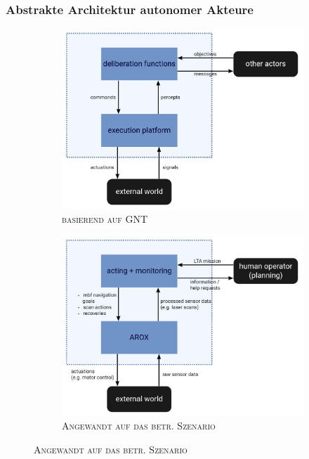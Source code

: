 \documentclass{beamer}
\begin{document}
\begin{frame}
  \frametitle{Abstrakte Architektur autonomer Akteure}
  \begin{figure}[H]
    \centering
    \begin{subfigure}[b]{0.49\textwidth}
        \centering
        \includegraphics[width=\textwidth]{img/GNT_actor_new.png}
        \caption*{\textsc{ basierend auf GNT \cite{GNT:2016}}}
    \end{subfigure}
    \hfill
    \begin{subfigure}[b]{0.49\textwidth}
        \centering
        \includegraphics[width=\textwidth]{img/MSC_actor_new.png}
        \caption*{\textsc{Angewandt auf das betr. Szenario}}
    \end{subfigure}
  \end{figure}
\end{frame}
\end{document}
